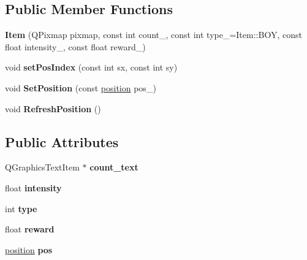 \subsection*{Public Member Functions}
\begin{DoxyCompactItemize}
\item 
{\bfseries Item} (Q\+Pixmap pixmap, const int count\+\_, const int type\+\_\+=Item\+::\+B\+OY, const float intensity\+\_, const float reward\+\_)\hypertarget{class_item_a8560c460d411e02eaf1c895927d87e2c}{}\label{class_item_a8560c460d411e02eaf1c895927d87e2c}

\item 
void {\bfseries set\+Pos\+Index} (const int sx, const int sy)\hypertarget{class_item_a705067b62641b477184ed230dfe73636}{}\label{class_item_a705067b62641b477184ed230dfe73636}

\item 
void {\bfseries Set\+Position} (const \hyperlink{structposition}{position} pos\+\_\+)\hypertarget{class_item_a8eae93e3528474efa4b3921e9c11b006}{}\label{class_item_a8eae93e3528474efa4b3921e9c11b006}

\item 
void {\bfseries Refresh\+Position} ()\hypertarget{class_item_a6afc8b5c805e0fd3655468f3609a4eb1}{}\label{class_item_a6afc8b5c805e0fd3655468f3609a4eb1}

\end{DoxyCompactItemize}
\subsection*{Public Attributes}
\begin{DoxyCompactItemize}
\item 
Q\+Graphics\+Text\+Item $\ast$ {\bfseries count\+\_\+text}\hypertarget{class_item_ae17075ec9a03088db6f561c4f9c76742}{}\label{class_item_ae17075ec9a03088db6f561c4f9c76742}

\item 
float {\bfseries intensity}\hypertarget{class_item_a27b5db0436c59d6c8f91c3bc787bf793}{}\label{class_item_a27b5db0436c59d6c8f91c3bc787bf793}

\item 
int {\bfseries type}\hypertarget{class_item_a22a98aed7ce8f0314b597a5739c415b7}{}\label{class_item_a22a98aed7ce8f0314b597a5739c415b7}

\item 
float {\bfseries reward}\hypertarget{class_item_a96e9e465bc41c9b5b775281771019587}{}\label{class_item_a96e9e465bc41c9b5b775281771019587}

\item 
\hyperlink{structposition}{position} {\bfseries pos}\hypertarget{class_item_a7ec0bf2287ce0cba665689292a86e429}{}\label{class_item_a7ec0bf2287ce0cba665689292a86e429}

\end{DoxyCompactItemize}

